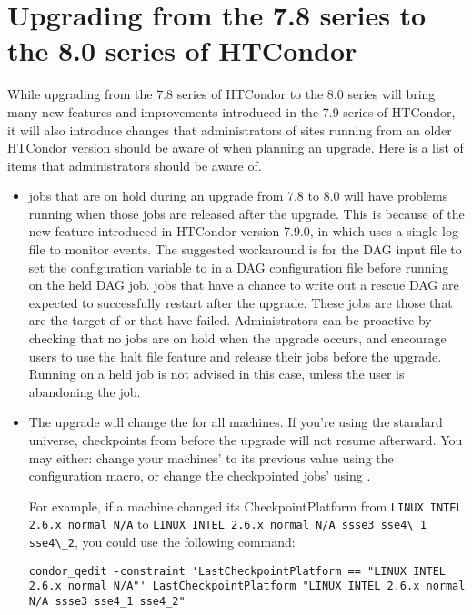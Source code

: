 \section{\label{sec:to-8.0}Upgrading from the 7.8 series to the 8.0 series of HTCondor}

While upgrading from the 7.8 series of HTCondor to the 8.0 series 
will bring many
new features and improvements introduced in the 7.9 series of HTCondor,
it will
also introduce changes that administrators of sites running from an older
HTCondor version should be aware of when planning an upgrade.  
Here is a list of items that administrators should be aware of.

\begin{itemize}

\item {} jobs that are on hold during an upgrade from 
7.8 to 8.0 will have
problems running when those jobs are released after the upgrade. 
This is because of
the new feature introduced in HTCondor version 7.9.0, 
in which  uses a single log file to monitor events.
The suggested workaround is for the
DAG input file to set the configuration variable 
 to
 in a DAG configuration file
 before running  on the held DAG job.
 jobs that have a chance to write out a rescue
DAG
are expected to successfully restart after the upgrade.
These jobs are those that are the target of  or that have failed.
Administrators can be proactive by
checking that no  jobs are on hold when the upgrade occurs,
and encourage users to use the halt file feature and release their 
 jobs before the upgrade.  
Running  on a held  job is
not advised in this case, unless the user is abandoning the job.

\item The upgrade will change the  for all
machines.  If you're using the standard universe, checkpoints from before
the upgrade will not resume afterward.  You may either: change your machines'
 to its previous value using the
 configuration macro, or change the checkpointed
jobs'  using .

For example, if a machine changed its CheckpointPlatform
from \verb;LINUX INTEL 2.6.x normal N/A; to 
\verb;LINUX INTEL 2.6.x normal N/A ssse3 sse4\_1 sse4\_2;, you could
use the following command:

\begin{verbatim}
condor_qedit -constraint 'LastCheckpointPlatform == "LINUX INTEL 2.6.x normal N/A"' LastCheckpointPlatform "LINUX INTEL 2.6.x normal N/A ssse3 sse4_1 sse4_2"
\end{verbatim}

\end{itemize}

